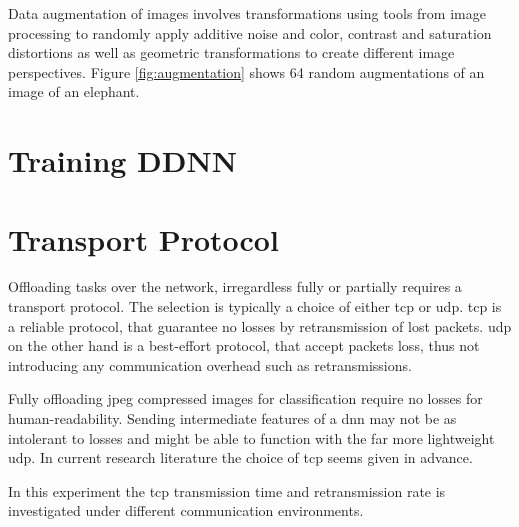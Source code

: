  Data augmentation of images involves transformations using tools from image processing to randomly apply additive noise and color, contrast and saturation distortions as well as geometric transformations to create different image perspectives. Figure \ref{fig:augmentation} shows 64 random augmentations of an image of an elephant. 




\section{Training DDNN}

\section{Transport Protocol} 

Offloading tasks over the network, irregardless fully or partially requires a transport protocol. The selection is typically a choice of either \gls{tcp} or \gls{udp}. \gls{tcp} is a reliable protocol, that guarantee no losses by retransmission of lost packets. \gls{udp} on the other hand is a best-effort protocol, that accept packets loss, thus not introducing any communication overhead such as retransmissions. 


Fully offloading \gls{jpeg} compressed images for classification require no losses for human-readability. Sending intermediate features of a \gls{dnn} may not be as intolerant to losses and might be able to function with the far more lightweight \gls{udp}. In current research literature the choice of \gls{tcp} seems given in advance.  


In this experiment the \gls{tcp} transmission time and retransmission rate is investigated under different communication environments. 